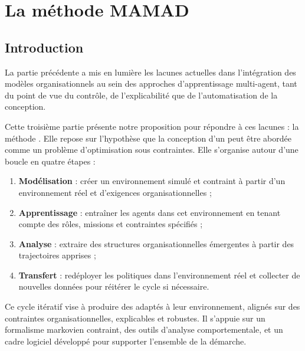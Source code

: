 \cleardoublepage
{}
\part{La méthode MAMAD}
\label{part:methode}

\chapter*{Introduction}

\noindent
La partie précédente a mis en lumière les lacunes actuelles dans l'intégration des modèles organisationnels au sein des approches d'apprentissage multi-agent, tant du point de vue du contrôle, de l'explicabilité que de l'automatisation de la conception.

\medskip

\noindent
Cette troisième partie présente notre proposition pour répondre à ces lacunes : la méthode . Elle repose sur l'hypothèse que la conception d'un  peut être abordée comme un problème d'optimisation sous contraintes. Elle s'organise autour d'une boucle en quatre étapes :

\begin{enumerate}
    \item \textbf{Modélisation} : créer un environnement simulé et contraint à partir d'un environnement réel et d'exigences organisationnelles ;
    \item \textbf{Apprentissage} : entraîner les agents dans cet environnement en tenant compte des rôles, missions et contraintes spécifiés ;
    \item \textbf{Analyse} : extraire des structures organisationnelles émergentes à partir des trajectoires apprises ;
    \item \textbf{Transfert} : redéployer les politiques dans l'environnement réel et collecter de nouvelles données pour réitérer le cycle si nécessaire.
\end{enumerate}

\noindent
Ce cycle itératif vise à produire des  adaptés à leur environnement, alignés sur des contraintes organisationnelles, explicables et robustes. Il s'appuie sur un formalisme markovien contraint, des outils d'analyse comportementale, et un cadre logiciel développé pour supporter l'ensemble de la démarche.

